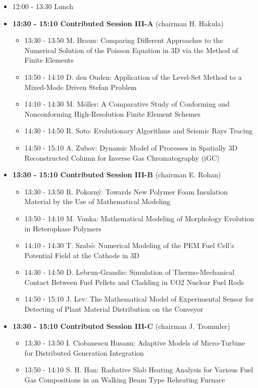 \documentclass[10pt, A4]{article}%
\begin{document}
\begin{itemize}
\begin{itemize}
  \end{itemize}
  \item 12:00 - 13:30 Lunch
  \item {\bf 13:30 - 15:10 Contributed Session III-A} (chairman H. Hakula) 
  \begin{itemize}
    \item 13:30 - 13:50 M. Braun: Comparing Different Approaches to the Numerical Solution of the Poisson Equation in 3D via the Method of Finite Elements
    \item 13:50 - 14:10 D. den Ouden: Application of the Level-Set Method to a Mixed-Mode Driven Stefan Problem
    \item 14:10 - 14:30 M. M\"{o}ller: A Comparative Study of Conforming and Nonconforming High-Resolution Finite Element Schemes
    \item 14:30 - 14:50 R. Soto: Evolutionary Algorithms and Seismic Rays Tracing
    \item 14:50 - 15:10 A. Zubov: Dynamic Model of Processes in Spatially 3D Reconstructed Column for Inverse Gas Chromatography (iGC)
  \end{itemize}
  \item {\bf 13:30 - 15:10 Contributed Session III-B} (chairman E. Rohan) 
  \begin{itemize}
    \item 13:30 - 13:50 R. Pokorn\'{y}: Towards New Polymer Foam Insulation Material by the Use of Mathematical Modeling
    \item 13:50 - 14:10 M. Vonka: Mathematical Modeling of Morphology Evolution in Heterophase Polymers
    \item 14:10 - 14:30 T. Szab\'{o}: Numerical Modeling of the PEM Fuel Cell’s Potential Field at the Cathode in 3D
    \item 14:30 - 14:50 D. Lebrun-Grandie: Simulation of Thermo-Mechanical Contact Between Fuel Pellets and Cladding in UO2 Nuclear Fuel Rods
    \item 14:50 - 15:10 J. Lev: The Mathematical Model of Experimental Sensor for Detecting of Plant Material Distribution on the Conveyor
  \end{itemize}
    \item {\bf 13:30 - 15:10 Contributed Session III-C} (chairman J. Trommler) 
  \begin{itemize}
    \item 13:30 - 13:50 I. Ciobanescu Husanu: Adaptive Models of Micro-Turbine for Distributed Generation Integration 
    \item 13:50 - 14:10 S. H. Han: Radiative Slab Heating Analysis for Various Fuel Gas Compositions in an Walking Beam Type Reheating Furnace

\end{itemize}
\end{itemize}
\end{document}
